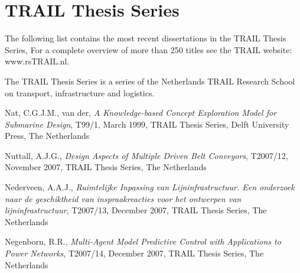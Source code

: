 \chapter*{TRAIL Thesis Series}
 

\noindent The following list contains the most recent dissertations in the TRAIL Thesis Series, For a complete overview of more than 250 titles see the TRAIL website: www.rsTRAIL.nl.

\vspace*{0.40cm}{}
\noindent The TRAIL Thesis Series is a series of the Netherlands TRAIL Research School on transport, infrastructure and logistics.

\vspace*{0.40cm}{}
\noindent Nat, C.G.J.M., van der, \textit{A Knowledge-based Concept
Exploration Model for Submarine Design}, T99/1, March 1999, TRAIL
Thesis Series, Delft University Press, The Netherlands

\vspace*{0.25cm}{} 
\noindent Nuttall, A.J.G., \textit{Design Aspects of Multiple Driven Belt Conveyors}, T2007/12, November 2007, TRAIL Thesis Series, The
Netherlands

\vspace*{0.25cm}{} 
\noindent Nederveen, A.A.J., \textit{Ruimtelijke Inpassing van Lijninfrastructuur. Een onderzoek naar de geschiktheid van inspraakreacties voor het ontwerpen van lijninfrastructuur}, T2007/13, December 2007, TRAIL Thesis Series, The
Netherlands

\vspace*{0.25cm}{} 
\noindent Negenborn, R.R., \textit{Multi-Agent Model Predictive Control with
Applications to Power Networks}, T2007/14, December 2007, TRAIL Thesis
Series, The Netherlands



